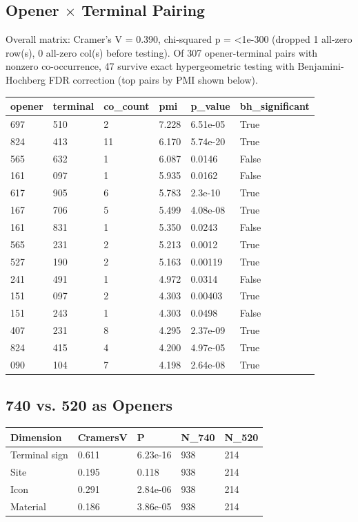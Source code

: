 \subsection{Opener $\times$ Terminal Pairing}
Overall matrix: Cramer's V = 0.390, chi-squared p = <1e-300 (dropped 1 all-zero row(s), 0 all-zero col(s) before testing). Of 307 opener-terminal pairs with nonzero co-occurrence,
47 survive exact hypergeometric testing with Benjamini-Hochberg FDR
correction (top pairs by PMI shown below).
\begin{tabular}{llllll}
\toprule
\textbf{opener} & \textbf{terminal} & \textbf{co\_count} & \textbf{pmi} & \textbf{p\_value} & \textbf{bh\_significant} \\
\midrule
697 & 510 & 2 & 7.228 & 6.51e-05 & True \\
824 & 413 & 11 & 6.170 & 5.74e-20 & True \\
565 & 632 & 1 & 6.087 & 0.0146 & False \\
161 & 097 & 1 & 5.935 & 0.0162 & False \\
617 & 905 & 6 & 5.783 & 2.3e-10 & True \\
167 & 706 & 5 & 5.499 & 4.08e-08 & True \\
161 & 831 & 1 & 5.350 & 0.0243 & False \\
565 & 231 & 2 & 5.213 & 0.0012 & True \\
527 & 190 & 2 & 5.163 & 0.00119 & True \\
241 & 491 & 1 & 4.972 & 0.0314 & False \\
151 & 097 & 2 & 4.303 & 0.00403 & True \\
151 & 243 & 1 & 4.303 & 0.0498 & False \\
407 & 231 & 8 & 4.295 & 2.37e-09 & True \\
824 & 415 & 4 & 4.200 & 4.97e-05 & True \\
090 & 104 & 7 & 4.198 & 2.64e-08 & True \\
\bottomrule
\end{tabular}

\subsection{740 vs. 520 as Openers}
\begin{tabular}{lllll}
\toprule
\textbf{Dimension} & \textbf{CramersV} & \textbf{P} & \textbf{N\_740} & \textbf{N\_520} \\
\midrule
Terminal sign & 0.611 & 6.23e-16 & 938 & 214 \\
Site & 0.195 & 0.118 & 938 & 214 \\
Icon & 0.291 & 2.84e-06 & 938 & 214 \\
Material & 0.186 & 3.86e-05 & 938 & 214 \\
\bottomrule
\end{tabular}


